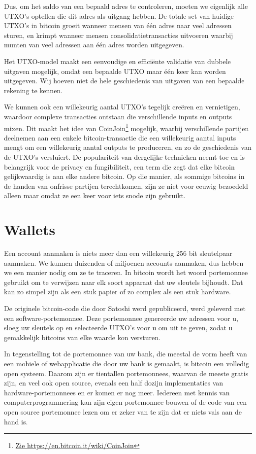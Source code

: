\documentclass[
  letterpaper,
]{scrbook}
\begin{document}
Dus, om het saldo van een bepaald adres te controleren, moeten we
eigenlijk alle UTXO's optellen die dit adres als uitgang hebben. De
totale set van huidige UTXO's in bitcoin groeit wanneer mensen van één
adres naar veel adressen sturen, en krimpt wanneer mensen
consolidatietransacties uitvoeren waarbij munten van veel adressen aan
één adres worden uitgegeven.

Het UTXO-model maakt een eenvoudige en efficiënte validatie van dubbele
uitgaven mogelijk, omdat een bepaalde UTXO maar één keer kan worden
uitgegeven. Wij hoeven niet de hele geschiedenis van uitgaven van een
bepaalde rekening te kennen.

We kunnen ook een willekeurig aantal UTXO's tegelijk creëren en
vernietigen, waardoor complexe transacties ontstaan die verschillende
inputs en outputs mixen. Dit maakt het idee van CoinJoin\footnote{\href{https://en.bitcoin.it/wiki/CoinJoin}{Zie
  https://en.bitcoin.it/wiki/CoinJoin}} mogelijk, waarbij verschillende
partijen deelnemen aan een enkele bitcoin-transactie die een willekeurig
aantal inputs mengt om een willekeurig aantal outputs te produceren, en
zo de geschiedenis van de UTXO's versluiert. De populariteit van
dergelijke technieken neemt toe en is belangrijk voor de privacy en
fungibiliteit, een term die zegt dat elke bitcoin gelijkwaardig is aan
elke andere bitcoin. Op die manier, als sommige bitcoins in de handen
van onfrisse partijen terechtkomen, zijn ze niet voor eeuwig bezoedeld
alleen maar omdat ze een keer voor iets snode zijn gebruikt.

\hypertarget{wallets}{%
\section{Wallets}\label{wallets}}

Een account aanmaken is niets meer dan een willekeurig 256 bit
sleutelpaar aanmaken. We kunnen duizenden of miljoenen accounts
aanmaken, dus hebben we een manier nodig om ze te traceren. In bitcoin
wordt het woord portemonnee gebruikt om te verwijzen naar elk soort
apparaat dat uw sleutels bijhoudt. Dat kan zo simpel zijn als een stuk
papier of zo complex als een stuk hardware.

De originele bitcoin-code die door Satoshi werd gepubliceerd, werd
geleverd met een software-portemonnee. Deze portemonnee genereerde uw
adressen voor u, sloeg uw sleutels op en selecteerde UTXO's voor u om
uit te geven, zodat u gemakkelijk bitcoins van elke waarde kon
versturen.

In tegenstelling tot de portemonnee van uw bank, die meestal de vorm
heeft van een mobiele of webapplicatie die door uw bank is gemaakt, is
bitcoin een volledig open systeem. Daarom zijn er tientallen
portemonnees, waarvan de meeste gratis zijn, en veel ook open source,
evenals een half dozijn implementaties van hardware-portemonnees en er
komen er nog meer. Iedereen met kennis van computerprogrammering kan
zijn eigen portemonnee bouwen of de code van een open source portemonnee
lezen om er zeker van te zijn dat er niets vals aan de hand is.
\end{document}
